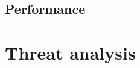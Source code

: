 \documentclass[a4paper,11pt,onecolumn]{memoir}
\begin{document}
\subsection[Performance]{Performance}

\section[Threat analysis]{Threat analysis}



\backmatter

\printbibliography
\end{document}

